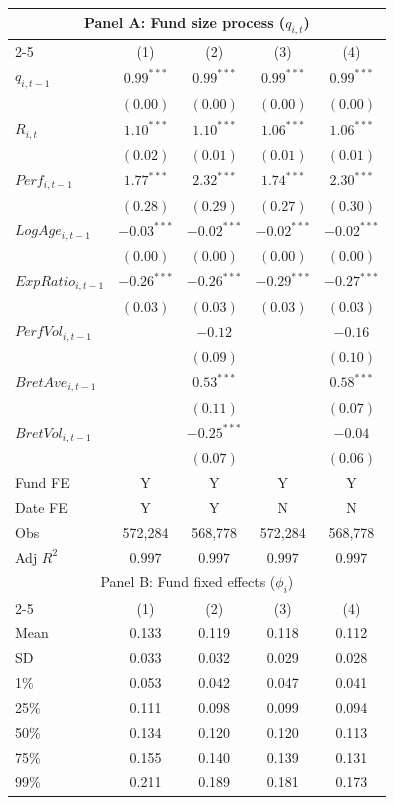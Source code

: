 \begin{tabular}{lcccc}
  \toprule \multicolumn{5}{c}{Panel A: Fund size process ($q_{i,t}$)} \\
 
 \cmidrule(l){2-5}  \vspace{5pt} & (1) & (2) & (3) & (4) \\ 
  $q_{i,t-1}$ & $0.99^{***}$ & $0.99^{***}$ & $0.99^{***}$ & $0.99^{***}$ \\ 
   & $(0.00)$ & $(0.00)$ & $(0.00)$ & $(0.00)$ \\ 
  $R_{i,t}$ & $1.10^{***}$ & $1.10^{***}$ & $1.06^{***}$ & $1.06^{***}$ \\ 
   & $(0.02)$ & $(0.01)$ & $(0.01)$ & $(0.01)$ \\ 
  $Perf_{i,t-1}$ & $1.77^{***}$ & $2.32^{***}$ & $1.74^{***}$ & $2.30^{***}$ \\ 
   & $(0.28)$ & $(0.29)$ & $(0.27)$ & $(0.30)$ \\ 
  $LogAge_{i,t-1}$ & $-0.03^{***}$ & $-0.02^{***}$ & $-0.02^{***}$ & $-0.02^{***}$ \\ 
   & $(0.00)$ & $(0.00)$ & $(0.00)$ & $(0.00)$ \\ 
  $ExpRatio_{i,t-1}$ & $-0.26^{***}$ & $-0.26^{***}$ & $-0.29^{***}$ & $-0.27^{***}$ \\ 
   & $(0.03)$ & $(0.03)$ & $(0.03)$ & $(0.03)$ \\ 
  $PerfVol_{i,t-1}$ &  & $-0.12$ &  & $-0.16$ \\ 
   &  & $(0.09)$ &  & $(0.10)$ \\ 
  $BretAve_{i,t-1}$ &  & $0.53^{***}$ &  & $0.58^{***}$ \\ 
   &  & $(0.11)$ &  & $(0.07)$ \\ 
  $BretVol_{i,t-1}$ &  & $-0.25^{***}$ &  & $-0.04$ \\ 
   \vspace{5pt} &  & $(0.07)$ &  & $(0.06)$ \\ 
  Fund FE & Y & Y & Y & Y \\ 
   \vspace{5pt}Date FE & Y & Y & N & N \\ 
  Obs & 572,284 & 568,778 & 572,284 & 568,778 \\ 
  Adj $R^2$ & $0.997$ & $0.997$ & $0.997$ & $0.997$ \\ 
   \hline \multicolumn{5}{c}{Panel B: Fund fixed effects ($\phi_i$)} \\
 
 \cmidrule(l){2-5} \vspace{5pt} 
 & (1) & (2) & (3) & (4) \\ 
  Mean & 0.133 & 0.119 & 0.118 & 0.112 \\ 
   \vspace{5pt}SD & 0.033 & 0.032 & 0.029 & 0.028 \\ 
  1\% & 0.053 & 0.042 & 0.047 & 0.041 \\ 
  25\% & 0.111 & 0.098 & 0.099 & 0.094 \\ 
  50\% & 0.134 & 0.120 & 0.120 & 0.113 \\ 
  75\% & 0.155 & 0.140 & 0.139 & 0.131 \\ 
  99\% & 0.211 & 0.189 & 0.181 & 0.173 \\ 
   \bottomrule 
\end{tabular}

